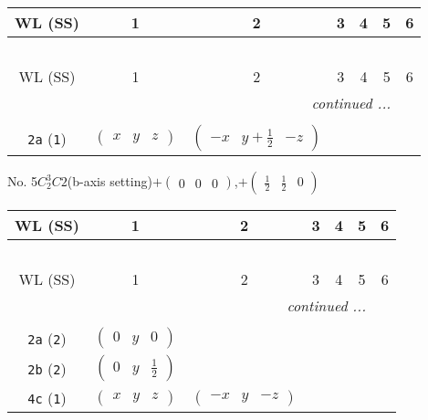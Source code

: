 \documentclass[fleqn,9pt,landscape]{jsarticle}
\begin{document}
\begin{center}
\renewcommand{\arraystretch}{1.2}
\begin{longtable}{ccccccc}
 \hline \hline
WL (SS) & 1 & 2 & 3 & 4 & 5 & 6 \\ \hline \endfirsthead

\multicolumn{6}{l}{\tablename\ \thetable{}} \\
 \hline \hline
WL (SS) & 1 & 2 & 3 & 4 & 5 & 6 \\ \hline \endhead

 \hline \hline
\multicolumn{6}{r}{\footnotesize\it continued ...} \\ \endfoot

 \hline \hline
\multicolumn{6}{r}{} \\ \endlastfoot

{\tt 2a} ({\tt 1}) & $ \begin{pmatrix} x & y & z \end{pmatrix} $ & $ \begin{pmatrix} - x & y + \frac{1}{2} & - z \end{pmatrix} $ \\
\end{longtable}
\end{center}
\newpage
No. 5\quad$C_{2}^{3}$\quad$C2$\quad(b-axis setting)\quad[ monoclinic ]\quad$+\begin{pmatrix} 0 & 0 & 0 \end{pmatrix}$,\quad $+\begin{pmatrix} \frac{1}{2} & \frac{1}{2} & 0 \end{pmatrix}$
\begin{center}
\renewcommand{\arraystretch}{1.2}
\begin{longtable}{ccccccc}
 \hline \hline
WL (SS) & 1 & 2 & 3 & 4 & 5 & 6 \\ \hline \endfirsthead

\multicolumn{6}{l}{\tablename\ \thetable{}} \\
 \hline \hline
WL (SS) & 1 & 2 & 3 & 4 & 5 & 6 \\ \hline \endhead

 \hline \hline
\multicolumn{6}{r}{\footnotesize\it continued ...} \\ \endfoot

 \hline \hline
\multicolumn{6}{r}{} \\ \endlastfoot

{\tt 2a} ({\tt 2}) & $ \begin{pmatrix} 0 & y & 0 \end{pmatrix} $ & $  $ \\ \hline
{\tt 2b} ({\tt 2}) & $ \begin{pmatrix} 0 & y & \frac{1}{2} \end{pmatrix} $ & $  $ \\ \hline
{\tt 4c} ({\tt 1}) & $ \begin{pmatrix} x & y & z \end{pmatrix} $ & $ \begin{pmatrix} - x & y & - z \end{pmatrix} $ \\
\end{longtable}
\end{center}
\end{document}
